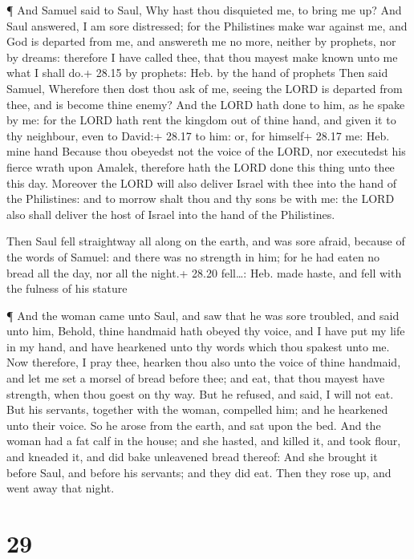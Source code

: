  ¶ And Samuel said to Saul, Why hast thou disquieted me, to
bring me up? And Saul answered, I am sore distressed; for the
Philistines make war against me, and God is departed from me, and
answereth me no more, neither by prophets, nor by dreams: therefore I
have called thee, that thou mayest make known unto me what I shall do.+
28.15 by prophets: Heb. by the hand of prophets  Then said
Samuel, Wherefore then dost thou ask of me, seeing the LORD is departed
from thee, and is become thine enemy?  And the LORD hath
done to him, as he spake by me: for the LORD hath rent the kingdom out
of thine hand, and given it to thy neighbour, even to David:+ 28.17 to
him: or, for himself+ 28.17 me: Heb. mine hand  Because
thou obeyedst not the voice of the LORD, nor executedst his fierce wrath
upon Amalek, therefore hath the LORD done this thing unto thee this day.
 Moreover the LORD will also deliver Israel with thee into
the hand of the Philistines: and to morrow shalt thou and thy sons be
with me: the LORD also shall deliver the host of Israel into the hand of
the Philistines.

 Then Saul fell straightway all along on the earth, and was
sore afraid, because of the words of Samuel: and there was no strength
in him; for he had eaten no bread all the day, nor all the night.+ 28.20
fell\ldots: Heb. made haste, and fell with the fulness of his stature

 ¶ And the woman came unto Saul, and saw that he was sore
troubled, and said unto him, Behold, thine handmaid hath obeyed thy
voice, and I have put my life in my hand, and have hearkened unto thy
words which thou spakest unto me.  Now therefore, I pray
thee, hearken thou also unto the voice of thine handmaid, and let me set
a morsel of bread before thee; and eat, that thou mayest have strength,
when thou goest on thy way.  But he refused, and said, I
will not eat. But his servants, together with the woman, compelled him;
and he hearkened unto their voice. So he arose from the earth, and sat
upon the bed.  And the woman had a fat calf in the house;
and she hasted, and killed it, and took flour, and kneaded it, and did
bake unleavened bread thereof:  And she brought it before
Saul, and before his servants; and they did eat. Then they rose up, and
went away that night.

\hypertarget{section-28}{%
\section{29}\label{section-28}}

